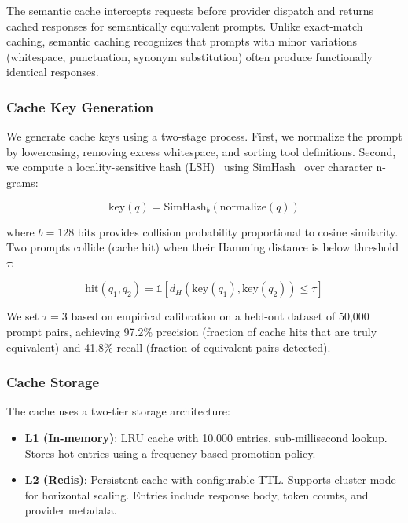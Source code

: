 The semantic cache intercepts requests before provider dispatch and returns cached responses for semantically equivalent prompts. Unlike exact-match caching, semantic caching recognizes that prompts with minor variations (whitespace, punctuation, synonym substitution) often produce functionally identical responses.

\subsubsection{Cache Key Generation}

We generate cache keys using a two-stage process. First, we normalize the prompt by lowercasing, removing excess whitespace, and sorting tool definitions. Second, we compute a locality-sensitive hash (LSH)~\cite{indyk1998approximate} using SimHash~\cite{charikar2002similarity} over character n-grams:

\begin{equation}
\text{key}(q) = \text{SimHash}_{b}(\text{normalize}(q))
\end{equation}

where $b = 128$ bits provides collision probability proportional to cosine similarity. Two prompts collide (cache hit) when their Hamming distance is below threshold $\tau$:

\begin{equation}
\text{hit}(q_1, q_2) = \mathbb{1}[d_H(\text{key}(q_1), \text{key}(q_2)) \leq \tau]
\end{equation}

We set $\tau = 3$ based on empirical calibration on a held-out dataset of 50,000 prompt pairs, achieving 97.2\% precision (fraction of cache hits that are truly equivalent) and 41.8\% recall (fraction of equivalent pairs detected).

\subsubsection{Cache Storage}

The cache uses a two-tier storage architecture:

\begin{itemize}[leftmargin=*]
    \item \textbf{L1 (In-memory)}: LRU cache with 10,000 entries, sub-millisecond lookup. Stores hot entries using a frequency-based promotion policy.
    \item \textbf{L2 (Redis)}: Persistent cache with configurable TTL. Supports cluster mode for horizontal scaling. Entries include response body, token counts, and provider metadata.
\end{itemize}

